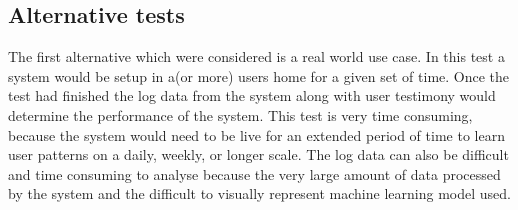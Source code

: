 \subsection{Alternative tests}
The first alternative which were considered is a real world use case. In this test a system would be setup in a(or more) users home for a given set of time. Once the test had finished the log data from the system along with user testimony would determine the performance of the system. This test is very time consuming, because the system would need to be live for an extended period of time to learn user patterns on a daily, weekly, or longer scale. The log data can also be difficult and time consuming to analyse because the very large amount of data processed by the system and the difficult to visually represent machine learning model used.
